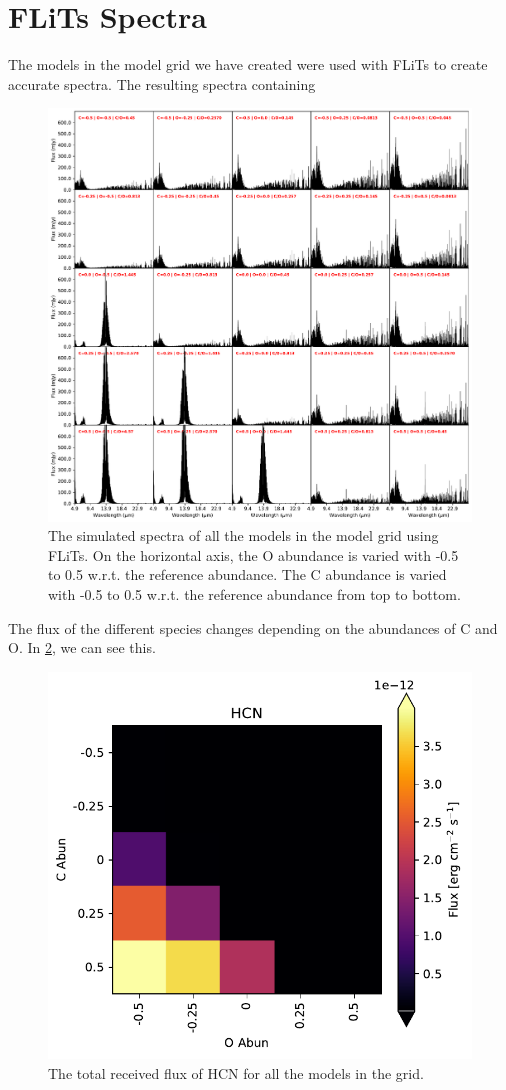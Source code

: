 \documentclass[twoside, single, authoryear, semicolon]{lion-msc}
\newcommand{\3}{$_3$}
\newcommand{\2}{$_2$}
\begin{document}
\section{FLiTs Spectra}
The models in the model grid we have created were used with FLiTs to create accurate spectra. The resulting spectra containing 
\begin{figure}[!h]
    \centering
    \includegraphics[width=\linewidth]{Figures/All_spectra.pdf}
    \caption{The simulated spectra of all the models in the model grid using FLiTs. On the horizontal axis, the O abundance is varied with -0.5 to 0.5 w.r.t. the reference abundance. The C abundance is varied with -0.5 to 0.5 w.r.t. the reference abundance from top to bottom.}
    \label{fig:all spectra}
\end{figure}
The flux of the different species changes depending on the abundances of C and O. In \ref{fig:flux HCN}, we can see this.
\begin{figure}[!ht]
    \centering
    \includegraphics[width=0.5\linewidth]{Figures/HCN_heatmap.pdf}
    \caption{The total received flux of HCN for all the models in the grid.}
    \label{fig:flux HCN}
\end{figure}
\end{document}

